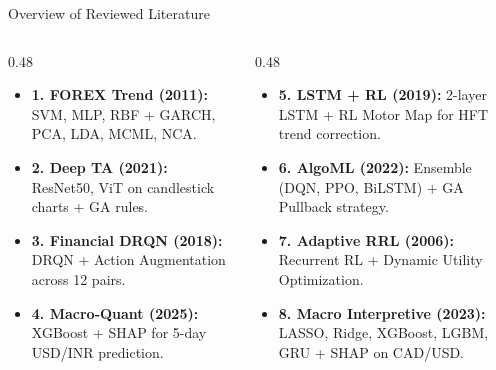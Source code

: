 \documentclass[aspectratio=169]{beamer}
\begin{document}
\begin{frame}{Overview of Reviewed Literature}
	
	\begin{columns}[T]
		\begin{column}{0.48\textwidth}
			\begin{itemize}
				\item \textbf{1. FOREX Trend (2011):} SVM, MLP, RBF + GARCH, PCA, LDA, MCML, NCA.
				\item \textbf{2. Deep TA (2021):} ResNet50, ViT on candlestick charts + GA rules.
				\item \textbf{3. Financial DRQN (2018):} DRQN + Action Augmentation across 12 pairs.
				\item \textbf{4. Macro-Quant (2025):} XGBoost + SHAP for 5-day USD/INR prediction.
			\end{itemize}
		\end{column}
		\begin{column}{0.48\textwidth}
			\begin{itemize}
				\item \textbf{5. LSTM + RL (2019):} 2-layer LSTM + RL Motor Map for HFT trend correction.
				\item \textbf{6. AlgoML (2022):} Ensemble (DQN, PPO, BiLSTM) + GA Pullback strategy.
				\item \textbf{7. Adaptive RRL (2006):} Recurrent RL + Dynamic Utility Optimization.
				\item \textbf{8. Macro Interpretive (2023):} LASSO, Ridge, XGBoost, LGBM, GRU + SHAP on CAD/USD.
			\end{itemize}
		\end{column}
	\end{columns}
\end{frame}
\end{document}
